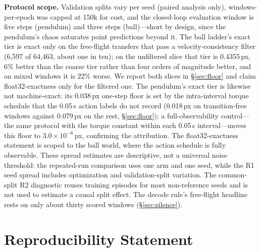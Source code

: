\documentclass{article}
\begin{document}
\textbf{Protocol scope.} Validation splits vary per seed (paired analysis only), windows-per-epoch was capped at 150k for cost, and the closed-loop evaluation window is five steps (pendulum) and three steps (ball)---short by design, since the pendulum's chaos saturates point predictions beyond it. The ball ladder's exact tier is exact only on the free-flight transfers that pass a velocity-consistency filter (6{,}597 of 64{,}463, about one in ten); on the unfiltered slice that tier is 0.4355\,px, $6\%$ better than the coarse tier rather than four orders of magnitude better, and on mixed windows it is $22\%$ worse. We report both slices in \S\ref{sec:floor} and claim float32-exactness only for the filtered one. The pendulum's exact tier is likewise not machine-exact: its 0.038\,px one-step floor is set by the intra-interval torque schedule that the 0.05\,s action labels do not record (0.018\,px on transition-free windows against 0.079\,px on the rest, \S\ref{sec:floor}); a full-observability control---the same protocol with the torque constant within each 0.05\,s interval---moves this floor to $3.0\times10^{-6}$\,px, confirming the attribution. The float32-exactness statement is scoped to the ball world, where the action schedule is fully observable. These spread estimates are descriptive, not a universal noise threshold: the repeated-run comparison uses one arm and one seed, while the R1 seed spread includes optimization and validation-split variation. The common-split R2 diagnostic reuses training episodes for most non-reference seeds and is not used to estimate a causal split effect. The decode rule's free-flight headline rests on only about thirty scored windows (\S\ref{sec:silence}).

\section{Reproducibility Statement}\label{sec:repro}
\end{document}

